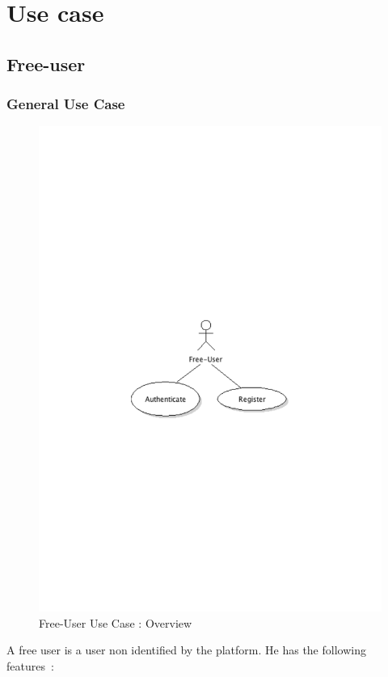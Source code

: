 \chapter{Use case}

\section{Free-user}
	\subsection{General Use Case}
		\begin{figure}[ht]
			\begin{center}
				\includegraphics[width=\textwidth,  trim=2cm 10cm 2cm 11cm]{UML_figure/UC/free_user/UC_FreeUser_General.pdf}
				\caption{Free-User Use Case : Overview}
			\end{center}
		\end{figure}
		A free user is a user non identified by the platform. He has the following features~:
